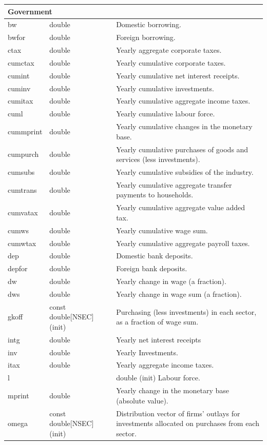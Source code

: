 \documentclass{article}
\begin{document}
\begin{longtable}{p{}p{}p{}}
\multicolumn{3}{l}{\textbf{Government}} \\
\midrule
bw & double & Domestic borrowing.\\
bwfor & double & Foreign borrowing.\\
ctax & double & Yearly aggregate corporate taxes.\\
cumctax & double & Yearly cumulative corporate taxes.\\
cumint & double & Yearly cumulative net interest receipts.\\
cuminv & double & Yearly cumulative investments.\\
cumitax & double & Yearly cumulative aggregate income taxes.\\
cuml & double & Yearly cumulative labour force.\\
cummprint & double & Yearly cumulative changes in the monetary base.\\
cumpurch & double & Yearly cumulative purchases of goods and services (less investments).\\
cumsubs & double & Yearly cumulative subsidies of the industry.\\
cumtrans & double & Yearly cumulative aggregate transfer payments to households.\\
cumvatax & double & Yearly cumulative aggregate value added tax.\\
cumws & double & Yearly cumulative wage sum.\\
cumwtax & double & Yearly cumulative aggregate payroll taxes.\\
dep & double & Domestic bank deposits.\\
depfor & double & Foreign bank deposits.\\
dw & double & Yearly change in wage (a fraction).\\
dws & double & Yearly change in wage sum (a fraction).\\
gkoff & const double[NSEC] (init) & Purchasing (less investments) in each sector, as a fraction of wage sum.\\
intg & double & Yearly net interest receipts\\
inv & double & Yearly Investments.\\
itax & double & Yearly aggregate income taxes.\\
l & & double (init) Labour force.\\
mprint & double & Yearly change in the monetary base (absolute value).\\
omega & const double[NSEC] (init) & Distribution vector of firms' outlays for investments allocated on purchases from each sector.\\

\end{longtable}
\end{document}
